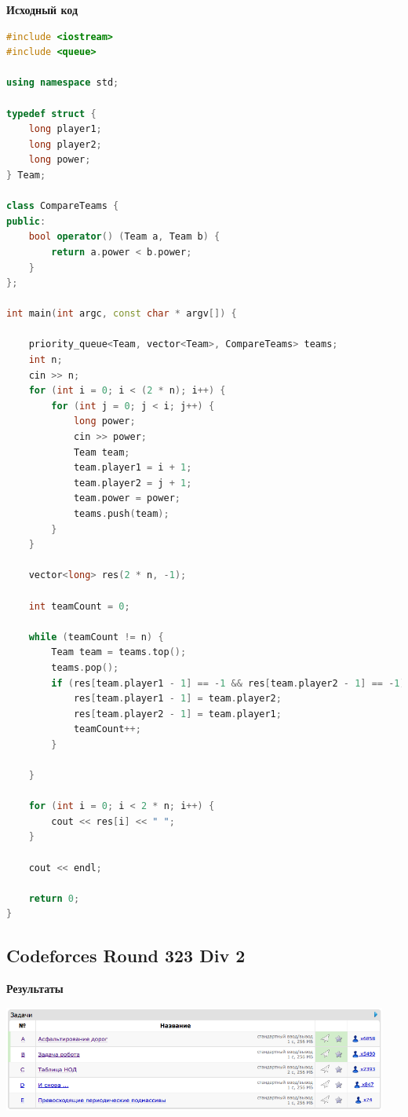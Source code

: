 \documentclass[a4paper,12pt]{article}
\begin{document}
\newpage
\textbf{{\large Исходный код}} \\
\begin{lstlisting}[language=C++]
#include <iostream>
#include <queue>

using namespace std;

typedef struct {
    long player1;
    long player2;
    long power;
} Team;

class CompareTeams {
public:
    bool operator() (Team a, Team b) {
        return a.power < b.power;
    }
};

int main(int argc, const char * argv[]) {
    
    priority_queue<Team, vector<Team>, CompareTeams> teams;
    int n;
    cin >> n;
    for (int i = 0; i < (2 * n); i++) {
        for (int j = 0; j < i; j++) {
            long power;
            cin >> power;
            Team team;
            team.player1 = i + 1;
            team.player2 = j + 1;
            team.power = power;
            teams.push(team);
        }
    }
    
    vector<long> res(2 * n, -1);
    
    int teamCount = 0;
    
    while (teamCount != n) {
        Team team = teams.top();
        teams.pop();
        if (res[team.player1 - 1] == -1 && res[team.player2 - 1] == -1) {
            res[team.player1 - 1] = team.player2;
            res[team.player2 - 1] = team.player1;
            teamCount++;
        }
        
    }
    
    for (int i = 0; i < 2 * n; i++) {
        cout << res[i] << " ";
    }
    
    cout << endl;
    
    return 0;
}
\end{lstlisting}



%
%

\newpage
\subsection{Codeforces Round 323 Div 2}

\textbf{{\large Результаты}} \\
\begin{center}
\includegraphics[width=0.95\textwidth]{C_323/result.png}\\ [1cm]
\end{center}
\end{document}
